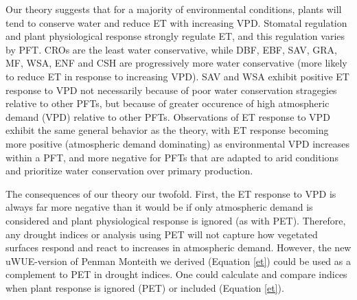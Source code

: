 \documentclass[draft,linenumbers]{agujournal}
\begin{document}
Our theory suggests that for a majority of environmental conditions, plants will tend to conserve water and reduce ET with increasing VPD. Stomatal regulation and plant physiological response strongly regulate ET, and this regulation varies by PFT. CROs are the least water conservative, while DBF, EBF, SAV, GRA, MF, WSA, ENF and CSH are progressively more water conservative (more likely to reduce ET in response to increasing VPD). SAV and WSA exhibit positive ET response to VPD not necessarily because of poor water conservation stragegies relative to other PFTs, but because of greater occurence of high atmospheric demand (VPD) relative to other PFTs. Observations of ET response to VPD exhibit the same general behavior as the theory, with ET response becoming more positive (atmospheric demand dominating) as environmental VPD increases within a PFT, and more negative for PFTs that are adapted to arid conditions and prioritize water conservation over primary production.

The consequences of our theory our twofold. First, the ET response to VPD is always far more negative than it would be if only atmospheric demand is considered and plant physiological response is ignored (as with PET). Therefore,  any drought indices or analysis using PET will not capture how  vegetated surfaces respond and react to increases in atmospheric demand. However, the new uWUE-version of Penman Monteith we derived (Equation \ref{et}) could be used as a complement to PET in drought indices. One could calculate and compare indices  when plant response is ignored (PET) or included (Equation \ref{et}). 
\end{document}

